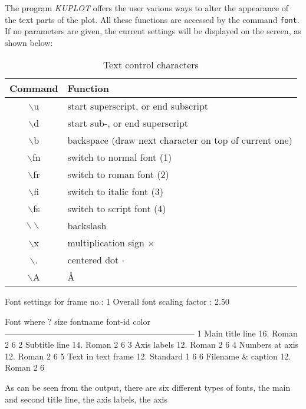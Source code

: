 The program {\it KUPLOT} offers the user various ways to alter the
appearance of the text parts of the plot. All these functions are
accessed by the command {\tt font}. If no parameters are given, the
current settings will be displayed on the screen, as shown below:
%
\begin{table}[!bt]
\centering
\begin{tabularx}{\textwidth}{|c|X|}
  \hline
  {\bf Command} & {\bf Function} \\
  \hline\hline
   $\backslash$u  & start superscript, or end subscript \\
   $\backslash$d  & start sub-, or end superscript \\
   $\backslash$b  & backspace (draw next character on top of current one) \\
   $\backslash$fn & switch to normal font (1) \\
   $\backslash$fr & switch to roman font  (2) \\
   $\backslash$fi & switch to italic font (3) \\
   $\backslash$fs & switch to script font (4) \\
  \hline
   $\backslash\backslash$  & backslash  \\
   $\backslash$x  & multiplication sign $\times$ \\
   $\backslash$.  & centered dot $\cdot$ \\
   $\backslash$A  & \AA \\
  \hline
\end{tabularx}
\caption{\label{pl1-tab2}Text control characters}
\end{table}
%
\begin{MacVerbatim}
   Font settings for frame no.:   1
      Overall font scaling factor  :   2.50

      Font  where ?              size   fontname            font-id   color
      ---------------------------------------------------------------------
        1   Main title line       16.  Roman                    2       6
        2   Subtitle line         14.  Roman                    2       6
        3   Axis labels           12.  Roman                    2       6
        4   Numbers at axis       12.  Roman                    2       6
        5   Text in text frame    12.  Standard                 1       6
        6   Filename & caption    12.  Roman                    2       6
\end{MacVerbatim}
%
As can be seen from the output, there are six different types of
fonts, the main and second title line, the axis labels, the axis
